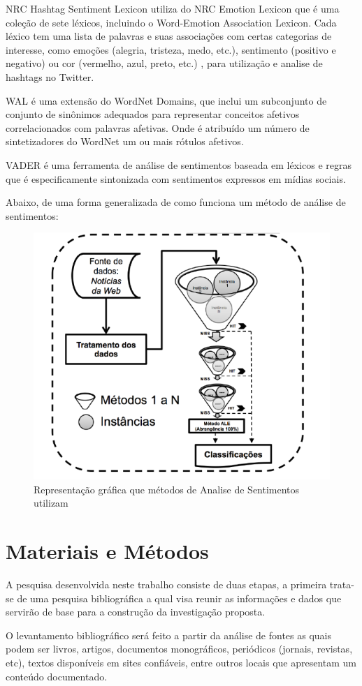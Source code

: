 \documentclass[12pt, a4paper]{article}
\begin{document}
NRC Hashtag Sentiment Lexicon utiliza do NRC Emotion Lexicon que é uma coleção de sete léxicos, incluindo o Word-Emotion Association Lexicon. Cada léxico tem uma lista de palavras e suas associações com certas categorias de interesse, como emoções (alegria, tristeza, medo, etc.), sentimento (positivo e negativo) ou cor (vermelho, azul, preto, etc.) \cite{nrcc}, para utilização e analise de hashtags no Twitter.

WAL é uma extensão do WordNet Domains, que inclui um subconjunto de conjunto de sinônimos adequados para representar conceitos afetivos correlacionados com palavras afetivas. Onde é atribuído um número de sintetizadores do WordNet um ou mais rótulos afetivos.

VADER é uma ferramenta de análise de sentimentos baseada em léxicos e regras que é especificamente sintonizada com sentimentos expressos em mídias sociais.

Abaixo, de uma forma generalizada de como funciona um método de análise de sentimentos:

\begin{figure}[H]
\centering
\includegraphics[width=.50\textwidth]{tecnica_de_analise.png}
\caption{Representação gráfica que métodos de Analise de Sentimentos utilizam}
\label{fig:Fig3}
\end{figure}

\newpage
\section{Materiais e Métodos}

A pesquisa desenvolvida neste trabalho consiste de duas etapas, a primeira trata-se de uma pesquisa bibliográfica a qual visa reunir as informações e dados que servirão de base para a construção da investigação proposta.

O levantamento bibliográfico será feito a partir da análise de fontes as quais podem ser livros, artigos, documentos monográficos, periódicos (jornais, revistas, etc), textos disponíveis em sites confiáveis, entre outros locais que apresentam um conteúdo documentado.
\end{document}
